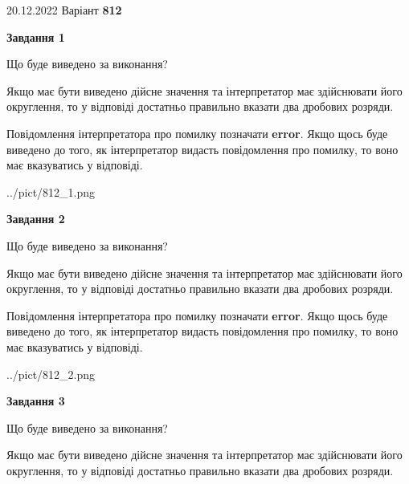 \documentclass[12pt, ukrainian]{article}
\begin{document}
{20.12.2022 Варіант \No \textbf { 812 }\par}
{
\begin {Large}

{\begin {center}\textbf{Завдання 1}\end {center}}\par
Що буде виведено за виконання? \par

Якщо має бути виведено дійсне значення та інтерпретатор має здійснювати його округлення, 
то у відповіді достатньо правильно вказати два дробових розряди.

Повідомлення інтерпретатора про помилку позначати \textbf{error}.
Якщо щось буде виведено до того, як інтерпретатор видасть повідомлення про помилку, 
то воно має вказуватись у відповіді. \par

\begin{center}
	{../pict/812_1.png}
\end{center}
\newpage

{\begin {center}\textbf{Завдання 2}\end {center}}\par
Що буде виведено за виконання? \par

Якщо має бути виведено дійсне значення та інтерпретатор має здійснювати його округлення, 
то у відповіді достатньо правильно вказати два дробових розряди.

Повідомлення інтерпретатора про помилку позначати \textbf{error}.
Якщо щось буде виведено до того, як інтерпретатор видасть повідомлення про помилку, 
то воно має вказуватись у відповіді. \par

\begin{center}
	{../pict/812_2.png}
\end{center}
\newpage

{\begin {center}\textbf{Завдання 3}\end {center}}\par
Що буде виведено за виконання? \par

Якщо має бути виведено дійсне значення та інтерпретатор має здійснювати його округлення, 
то у відповіді достатньо правильно вказати два дробових розряди.


\end{Large}}
\end{document}
